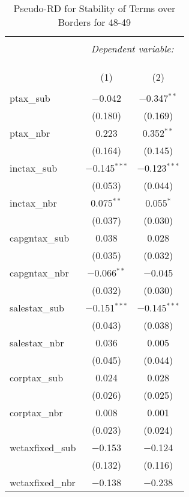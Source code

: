 
\begin{table}[!htbp] \centering 
  \caption{Pseudo-RD for Stability of Terms over Borders for  48-49} 
  \label{} 
\begin{tabular}{@{\extracolsep{5pt}}lcc} 
\\[-1.8ex]\hline 
\hline \\[-1.8ex] 
 & \multicolumn{2}{c}{\textit{Dependent variable:}} \\ 
\cline{2-3} 
\\[-1.8ex] & \multicolumn{2}{c}{ } \\ 
\\[-1.8ex] & (1) & (2)\\ 
\hline \\[-1.8ex] 
 ptax\_sub & $-$0.042 & $-$0.347$^{**}$ \\ 
  & (0.180) & (0.169) \\ 
  ptax\_nbr & 0.223 & 0.352$^{**}$ \\ 
  & (0.164) & (0.145) \\ 
  inctax\_sub & $-$0.145$^{***}$ & $-$0.123$^{***}$ \\ 
  & (0.053) & (0.044) \\ 
  inctax\_nbr & 0.075$^{**}$ & 0.055$^{*}$ \\ 
  & (0.037) & (0.030) \\ 
  capgntax\_sub & 0.038 & 0.028 \\ 
  & (0.035) & (0.032) \\ 
  capgntax\_nbr & $-$0.066$^{**}$ & $-$0.045 \\ 
  & (0.032) & (0.030) \\ 
  salestax\_sub & $-$0.151$^{***}$ & $-$0.145$^{***}$ \\ 
  & (0.043) & (0.038) \\ 
  salestax\_nbr & 0.036 & 0.005 \\ 
  & (0.045) & (0.044) \\ 
  corptax\_sub & 0.024 & 0.028 \\ 
  & (0.026) & (0.025) \\ 
  corptax\_nbr & 0.008 & 0.001 \\ 
  & (0.023) & (0.024) \\ 
  wctaxfixed\_sub & $-$0.153 & $-$0.124 \\ 
  & (0.132) & (0.116) \\ 
  wctaxfixed\_nbr & $-$0.138 & $-$0.238 \\ 

\end{tabular}
\end{table}
